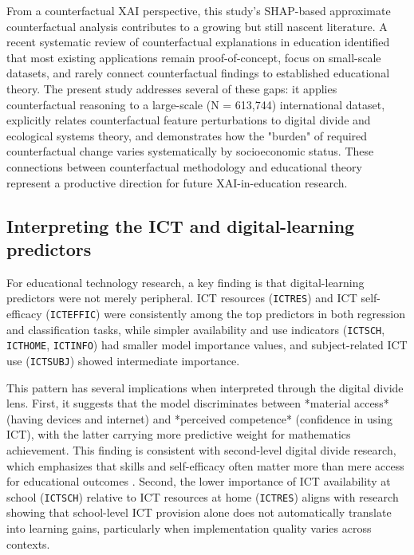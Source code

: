 \documentclass[pdflatex,sn-mathphys-ay]{sn-jnl}
\begin{document}
From a counterfactual XAI perspective, this study's SHAP-based approximate counterfactual analysis contributes to a growing but still nascent literature. A recent systematic review of counterfactual explanations in education \citep{WIREs_2025_counterfactual} identified that most existing applications remain proof-of-concept, focus on small-scale datasets, and rarely connect counterfactual findings to established educational theory. The present study addresses several of these gaps: it applies counterfactual reasoning to a large-scale (N = 613,744) international dataset, explicitly relates counterfactual feature perturbations to digital divide and ecological systems theory, and demonstrates how the "burden" of required counterfactual change varies systematically by socioeconomic status. These connections between counterfactual methodology and educational theory represent a productive direction for future XAI-in-education research.

\subsection{Interpreting the ICT and digital-learning predictors}

For educational technology research, a key finding is that digital-learning predictors were not merely peripheral. ICT resources (\texttt{ICTRES}) and ICT self-efficacy (\texttt{ICTEFFIC}) were consistently among the top predictors in both regression and classification tasks, while simpler availability and use indicators (\texttt{ICTSCH}, \texttt{ICTHOME}, \texttt{ICTINFO}) had smaller model importance values, and subject-related ICT use (\texttt{ICTSUBJ}) showed intermediate importance.

This pattern has several implications when interpreted through the digital divide lens. First, it suggests that the model discriminates between *material access* (having devices and internet) and *perceived competence* (confidence in using ICT), with the latter carrying more predictive weight for mathematics achievement. This finding is consistent with second-level digital divide research, which emphasizes that skills and self-efficacy often matter more than mere access for educational outcomes \citep{Scheerder_2017,Hargittai_2010}. Second, the lower importance of ICT availability at school (\texttt{ICTSCH}) relative to ICT resources at home (\texttt{ICTRES}) aligns with research showing that school-level ICT provision alone does not automatically translate into learning gains, particularly when implementation quality varies across contexts.
\end{document}
